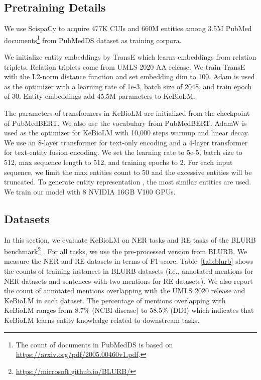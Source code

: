 \documentclass[11pt]{article}
\begin{document}
\subsection{Pretraining Details}
We use ScispaCy to acquire 477K CUIs and 660M entities among 3.5M PubMed documents\footnote{The count of documents in PubMedDS is based on \url{https://arxiv.org/pdf/2005.00460v1.pdf}.} from PubMedDS dataset \cite{vashishth2020medtype} as training corpora.

We initialize entity embeddings by TransE \cite{bordes2013translating} which learns embeddings from relation triplets.
Relation triplets come from UMLS 2020 AA release.
We train TransE with the L2-norm distance function and set embedding dim to 100.
Adam \cite{kingma2014adam} is used as the optimizer with a learning rate of 1e-3, batch size of 2048, and train epoch of 30.
Entity embeddings add 45.5M parameters to KeBioLM.

The parameters of transformers in KeBioLM are initialized from the checkpoint of PubMedBERT.
We also use the vocabulary from PubMedBERT.
AdamW \cite{loshchilov2017decoupled} is used as the optimizer for KeBioLM with 10,000 steps warmup and linear decay.
We use an 8-layer transformer for text-only encoding and a 4-layer transformer for text-entity fusion encoding.
We set the learning rate to 5e-5, batch size to 512, max sequence length to 512, and training epochs to 2.
For each input sequence, we limit the max entities count to 50 and the excessive entities will be truncated.
To generate entity representation , the most  similar entities are used.
We train our model with 8 NVIDIA 16GB V100 GPUs.


\subsection{Datasets}
In this section, we evaluate KeBioLM on NER tasks and RE tasks of the BLURB benchmark\footnote{\url{https://microsoft.github.io/BLURB/}} \cite{gu2020domain}.
For all tasks, we use the pre-processed version from BLURB.
We measure the NER and RE datasets in terms of F1-score.
Table~\ref{tab:blurb} shows the counts of training instances in BLURB datasets (i.e., annotated mentions for NER datasets and sentences with two mentions for RE datasets).
We also report the count of annotated mentions overlapping with the UMLS 2020 release and KeBioLM in each dataset.
The percentage of mentions overlapping with KeBioLM ranges from 8.7\% (NCBI-disease) to 58.5\% (DDI) which indicates that KeBioLM learns entity knowledge related to downstream tasks.
\end{document}
